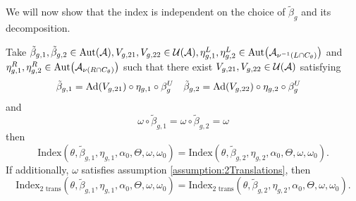 \documentclass[11pt,a4paper,twoside]{article}
\numberwithin{equation}{section}
\begin{document}
	We will now show that the index is independent on the choice of $\tilde{\beta}_g$ and its decomposition.
	\begin{lemma}\label{lem:InvarianceUnderChoiceBeta}
		Take $\tilde{\beta}_{g,1},\tilde{\beta}_{g,2}\in\Aut{\AA},V_{g,21},V_{g,22}\in\UU(\AA),\eta_{g,1}^L,\eta_{g,2}^L\in \Aut{\AA_{\nu^{-1}(L\cap C_\theta)}}$ and $\eta_{g,1}^R,\eta_{g,2}^R\in \Aut{\AA_{\nu(R\cap C_\theta)}}$ such that there exist $V_{g,21},V_{g,22}\in\mathcal U(\mathcal A)$ satisfying
		\begin{align}\label{eq:InvarianceUnderChoiceBetaTwoBetas}
			\tilde{\beta}_{g,1}&=\Ad{V_{g,21}}\circ\eta_{g,1}\circ\beta^U_g&\tilde{\beta}_{g,2}&=\Ad{V_{g,22}}\circ\eta_{g,2}\circ\beta^U_g
		\end{align}
		and
		\begin{equation}
			\omega\circ\tilde{\beta}_{g,1}=\omega\circ\tilde{\beta}_{g,2}=\omega
		\end{equation}
		then
		\begin{equation}
			\textrm{Index}(\theta,\tilde{\beta}_{g,1},\eta_{g,1},\alpha_{0},\Theta,\omega,\omega_0)=\textrm{Index}(\theta,\tilde{\beta}_{g,2},\eta_{g,2},\alpha_{0},\Theta,\omega,\omega_0).
		\end{equation}
		If additionally, $\omega$ satisfies assumption \ref{assumption:2Translations},	then
		\begin{equation}
			\textrm{Index}_{\text{2 trans}}(\theta,\tilde{\beta}_{g,1},\eta_{g,1},\alpha_{0},\Theta,\omega,\omega_0)=\textrm{Index}_{\text{2 trans}}(\theta,\tilde{\beta}_{g,2},\eta_{g,2},\alpha_{0},\Theta,\omega,\omega_0).
		\end{equation}
	\end{lemma}
\end{document}
